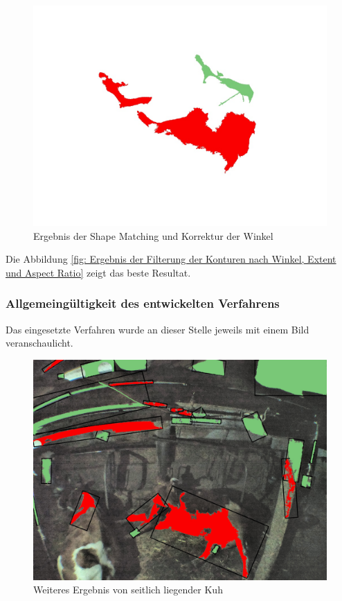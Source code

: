 \begin{figure}[H]
	\center
	\includegraphics[scale=0.43]{Grafiken/entwicklung/32BlankFilteredBySimilarity.jpg}
	\caption{Ergebnis der Shape Matching und Korrektur der Winkel} 
	\label{fig: Ergebnis der Shape Matching und Korrektur der Winkel} 
\end{figure}


Die Abbildung \ref{fig: Ergebnis der Filterung der Konturen nach Winkel, Extent und Aspect Ratio} zeigt das beste Resultat.

\subsubsection{Allgemeingültigkeit des entwickelten Verfahrens }

Das eingesetzte Verfahren wurde an dieser Stelle jeweils mit einem Bild veranschaulicht. 
\begin{figure}[H]
	\center
	\includegraphics[scale=0.1]{Grafiken/resultate/resultatLying2.jpg}
	\caption{Weiteres Ergebnis von seitlich liegender Kuh} 
	\label{fig: Weiteres Ergebnis von seitlich liegender Kuh} 
\end{figure}